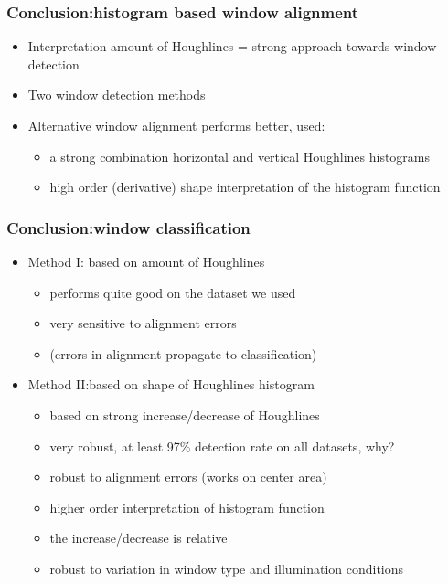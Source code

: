 \documentclass{beamer}
\begin{document}
\frame
{
	\frametitle{Conclusion:histogram based window alignment}		

	\begin{itemize}
	\item <+-| alert@+> Interpretation amount of Houghlines = strong approach towards window
	detection
	\item <+-| alert@+> Two window detection methods
	\item <+-| alert@+> Alternative window alignment performs better, used:
		\begin{itemize}
		\item <+-| alert@+> a strong combination horizontal and vertical Houghlines histograms
		\item <+-| alert@+> high order (derivative) shape interpretation of the histogram function
		\end{itemize}
	
	
	\end{itemize}

}
\frame
{
	\frametitle{Conclusion:window classification}		
	\begin{itemize}
	\item <+-| alert@+> Method I: based on amount of Houghlines
		\begin{itemize}
		\item <+-| alert@+> performs quite good on the dataset we used
		\item <+-| alert@+> very sensitive to alignment errors
		\item <+-| alert@+> (errors in alignment propagate to classification)
		\end{itemize}
	\item <+-| alert@+> Method II:based on shape of Houghlines histogram
		\begin{itemize}
		\item <+-| alert@+> based on strong increase/decrease of Houghlines
		\item <+-| alert@+> very robust, at least 97\% detection rate on all datasets, why?
		\item <+-| alert@+> robust to alignment errors (works on center area)
		\item <+-| alert@+> higher order interpretation of histogram function
		\item <+-| alert@+> the increase/decrease is relative
		\item <+-| alert@+> robust to variation in window type and illumination conditions
		\end{itemize}
	\end{itemize}
}
\end{document}
